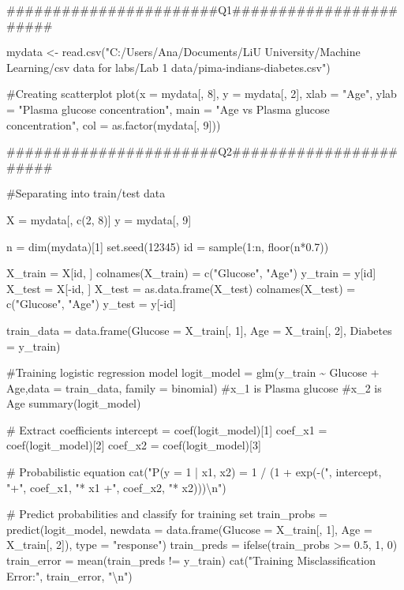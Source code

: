 \documentclass[
]{article}
\newenvironment{Shaded}{\begin{snugshade}}{\end{snugshade}}
\newcommand{\NormalTok}[1]{#1}
\begin{document}
\begin{Shaded}
\begin{Highlighting}[]
\NormalTok{\#\#\#\#\#\#\#\#\#\#\#\#\#\#\#\#\#\#\#\#\#\#\#Q1\#\#\#\#\#\#\#\#\#\#\#\#\#\#\#\#\#\#\#\#\#\#\#}

\NormalTok{mydata \textless{}{-} read.csv("C:/Users/Ana/Documents/LiU University/Machine Learning/csv data for labs/Lab 1 data/pima{-}indians{-}diabetes.csv")}

\NormalTok{\#Creating scatterplot}
\NormalTok{plot(x = mydata[, 8], }
\NormalTok{     y = mydata[, 2],}
\NormalTok{     xlab = "Age",}
\NormalTok{     ylab = "Plasma glucose concentration",}
\NormalTok{     main = "Age vs Plasma glucose concentration",}
\NormalTok{     col = as.factor(mydata[, 9]))}

\NormalTok{\#\#\#\#\#\#\#\#\#\#\#\#\#\#\#\#\#\#\#\#\#\#\#Q2\#\#\#\#\#\#\#\#\#\#\#\#\#\#\#\#\#\#\#\#\#\#\#}

\NormalTok{\#Separating into train/test data}

\NormalTok{X = mydata[, c(2, 8)]  }
\NormalTok{y = mydata[, 9]        }


\NormalTok{n = dim(mydata)[1]    }
\NormalTok{set.seed(12345)        }
\NormalTok{id = sample(1:n, floor(n*0.7))  }

\NormalTok{X\_train = X[id, ] }
\NormalTok{colnames(X\_train) = c("Glucose", "Age")}
\NormalTok{y\_train = y[id]        }
\NormalTok{X\_test = X[{-}id, ]  }
\NormalTok{X\_test = as.data.frame(X\_test)}
\NormalTok{colnames(X\_test) = c("Glucose", "Age")}
\NormalTok{y\_test = y[{-}id]        }

\NormalTok{train\_data = data.frame(Glucose = X\_train[, 1], Age = X\_train[, 2], Diabetes = y\_train)}

\NormalTok{\#Training logistic regression model}
\NormalTok{logit\_model = glm(y\_train \textasciitilde{} Glucose + Age,data = train\_data, family = binomial)}
\NormalTok{\#x\_1 is Plasma glucose}
\NormalTok{\#x\_2 is Age}
\NormalTok{summary(logit\_model)}

\NormalTok{\# Extract coefficients}
\NormalTok{intercept = coef(logit\_model)[1]}
\NormalTok{coef\_x1 = coef(logit\_model)[2]  }
\NormalTok{coef\_x2 = coef(logit\_model)[3]  }

\NormalTok{\# Probabilistic equation}
\NormalTok{cat("P(y = 1 | x1, x2) = 1 / (1 + exp({-}(", intercept, "+", coef\_x1, "* x1 +", coef\_x2, "* x2)))\textbackslash{}n")}

\NormalTok{\# Predict probabilities and classify for training set}
\NormalTok{train\_probs = predict(logit\_model, newdata = data.frame(Glucose = X\_train[, 1], Age = X\_train[, 2]), type = "response")}
\NormalTok{train\_preds = ifelse(train\_probs \textgreater{}= 0.5, 1, 0)}
\NormalTok{train\_error = mean(train\_preds != y\_train)}
\NormalTok{cat("Training Misclassification Error:", train\_error, "\textbackslash{}n")}



\end{Highlighting}
\end{Shaded}
\end{document}
